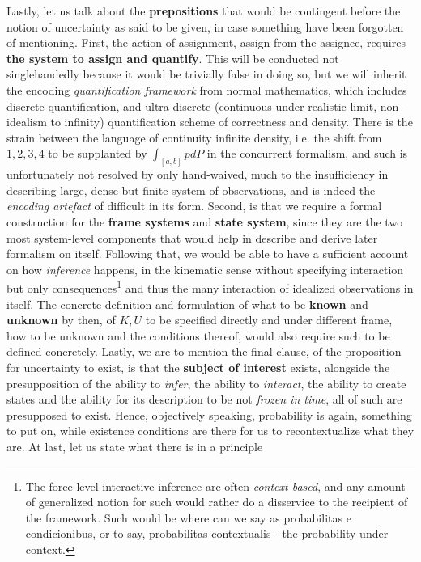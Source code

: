 Lastly, let us talk about the \textbf{prepositions} that would be contingent before the notion of uncertainty as said to be given, in case something have been forgotten of mentioning. First, the action of assignment, assign from the assignee, requires \textbf{the system to assign and quantify}. This will be conducted not singlehandedly because it would be trivially false in doing so, but we will inherit the encoding \textit{quantification framework} from normal mathematics, which includes discrete quantification, and ultra-discrete (continuous under realistic limit, non-idealism to infinity) quantification scheme of correctness and density. There is the strain between the language of continuity infinite density, i.e. the shift from $1,2,3,4$ to be supplanted by $\int_{[a,b]}pdP$ in the concurrent formalism, and such is unfortunately not resolved by only hand-waived, much to the insufficiency in describing large, dense but finite system of observations, and is indeed the \textit{encoding artefact} of difficult in its form. Second, is that we require a formal construction for the \textbf{frame systems} and \textbf{state system}, since they are the two most system-level components that would help in describe and derive later formalism on itself. Following that, we would be able to have a sufficient account on how \textit{inference} happens, in the kinematic sense without specifying interaction but only consequences\footnote{The force-level interactive inference are often \textit{context-based}, and any amount of generalized notion for such would rather do a disservice to the recipient of the framework. Such would be where can we say as probabilitas e condicionibus, or to say, probabilitas contextualis - the probability under context.} and thus the many interaction of idealized observations in itself. The concrete definition and formulation of what to be \textbf{known} and \textbf{unknown} by then, of $K,U$ to be specified directly and under different frame, how to be unknown and the conditions thereof, would also require such to be defined concretely. Lastly, we are to mention the final clause, of the proposition for uncertainty to exist, is that the \textbf{subject of interest} exists, alongside the presupposition of the ability to \textit{infer}, the ability to \textit{interact}, the ability to create states and the ability for its description to be not \textit{frozen in time}, all of such are presupposed to exist. Hence, objectively speaking, probability is again, something to put on, while existence conditions are there for us to recontextualize what they are. At last, let us state what there is in a principle
